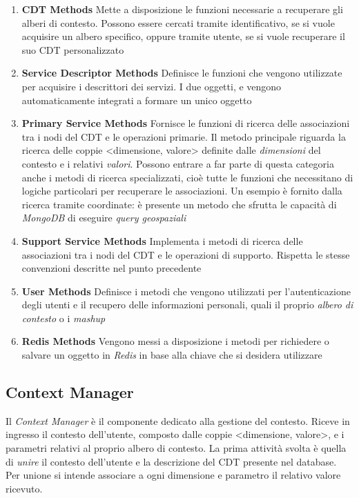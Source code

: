 \begin{enumerate}
	\item \textbf{CDT Methods}
	Mette a disposizione le funzioni necessarie a recuperare gli alberi di contesto. Possono essere cercati tramite identificativo, se si vuole acquisire un albero specifico, oppure tramite utente, se si vuole recuperare il suo CDT personalizzato
	\item \textbf{Service Descriptor Methods}
	Definisce le funzioni che vengono utilizzate per acquisire i descrittori dei servizi. I due oggetti,  e  vengono automaticamente integrati a formare un unico oggetto
	\item \textbf{Primary Service Methods}
	Fornisce le funzioni di ricerca delle associazioni tra i nodi del CDT e le operazioni primarie. Il metodo principale riguarda la ricerca delle coppie {<}dimensione, valore{>} definite dalle \emph{dimensioni} del contesto e i relativi \emph{valori}. Possono entrare a far parte di questa categoria anche i metodi di ricerca specializzati, cioè tutte le funzioni che necessitano di logiche particolari per recuperare le associazioni. Un esempio è fornito dalla ricerca tramite coordinate: è presente un metodo che sfrutta le capacità di \emph{MongoDB} di eseguire \emph{query geospaziali}
	\item \textbf{Support Service Methods}
	Implementa i metodi di ricerca delle associazioni tra i nodi del CDT e le operazioni di supporto. Rispetta le stesse convenzioni descritte nel punto precedente
	\item \textbf{User Methods}
	Definisce i metodi che vengono utilizzati per l'autenticazione degli utenti e il recupero delle informazioni personali, quali il proprio \emph{albero di contesto} o i \emph{mashup}
	\item \textbf{Redis Methods}
	Vengono messi a disposizione i metodi per richiedere o salvare un oggetto in \emph{Redis} in base alla chiave che si desidera utilizzare
\end{enumerate}

\subsection{Context Manager\label{sec:context-manager}}

Il \emph{Context Manager} è il componente dedicato alla gestione del contesto. Riceve in ingresso il contesto dell'utente, composto dalle coppie {<}dimensione, valore{>}, e i parametri relativi al proprio albero di contesto. La prima attività svolta è quella di \emph{unire} il contesto dell'utente e la descrizione del CDT presente nel database. Per unione si intende associare a ogni dimensione e parametro il relativo valore ricevuto.

